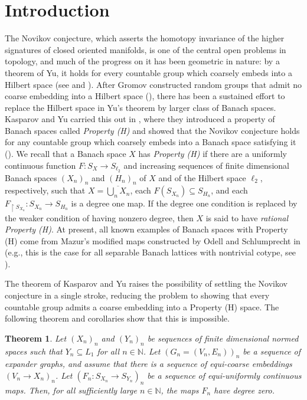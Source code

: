\documentclass[11pt]{amsart}
\newcommand{\N}{\mathbb{N}}
\newtheorem{theorem}{Theorem}
\theoremstyle{definition}
\theoremstyle{remark}
\begin{document}
\section{Introduction}

The Novikov conjecture, which asserts the homotopy invariance of the higher
signatures of closed oriented manifolds, is one of the central open problems
in topology, and much of the progress on it has been geometric in nature: by
a theorem of Yu, it holds for every countable group which coarsely embeds
into a Hilbert space (see \cite[Corollary 1.2]{Yu2000} and \cite[Theorem 6.1]{SkandalisTuYu2002Top}). After Gromov constructed random groups that admit no coarse embedding into
a Hilbert space (\cite[Section 4.8]{Gromov2003GAFA}), there has been a sustained effort to
replace the Hilbert space in Yu's theorem by larger class of Banach spaces. Kasparov
and Yu carried this out in \cite{KasparovYu2012GeoTop}, where they introduced
a property of Banach spaces called \emph{Property (H)} and showed that the
Novikov conjecture holds for any countable group which coarsely embeds into a
Banach space satisfying it (\cite[Theorem 1.2]{KasparovYu2012GeoTop}). We recall that a Banach space $X$ has \emph{Property (H)} if there are a uniformly continuous function $F\colon S_X\to S_{\ell_2}$ and increasing sequences of finite dimensional Banach spaces $(X_n)_n$ and $(H_n)_n$ of $X$ and of the Hilbert space $\ell_2$, respectively, such that $X=\overline{\bigcup_nX_n}$, each $F(S_{X_n})\subseteq S_{H_n}$, and each $F_{\restriction S_{X_n}}\colon  S_{X_n}\to S_{H_n}$ is a degree one map. If the degree one condition is replaced by the weaker condition of having nonzero degree, then $X$ is said to have {\it rational Property (H)}. At present, all known examples of Banach spaces with Property (H) come from Mazur's modified maps constructed by Odell and Schlumprecht in \cite{OdellSchlumprecht1994Acta} (e.g., this is the case for all separable Banach lattices with nontrivial cotype, see \cite[Theorem 1.1]{ChengWang2018JMAA}).

The theorem of Kasparov and Yu raises the possibility of settling the Novikov conjecture in a single stroke, reducing the problem to showing that every countable group admits a coarse embedding into a Property (H) space. The following theorem and corollaries show that this is impossible.

\begin{theorem}\label{Thm.main}
Let $(X_n)_n$ and $(Y_n)_n$ be sequences of finite dimensional normed spaces such that $Y_n\subseteq L_1$ for all $n\in\N$. Let $(G_n=(V_n,E_n))_n$ be a sequence of expander graphs, and assume that there is a sequence of equi-coarse embeddings $(V_n\to X_n)_n$. Let $(F_n\colon S_{X_n}\to S_{Y_n})_n$ be a sequence of equi-uniformly continuous maps. Then, for all sufficiently large $n\in\N$, the maps $F_n$ have degree zero.
\end{theorem}
\end{document}
